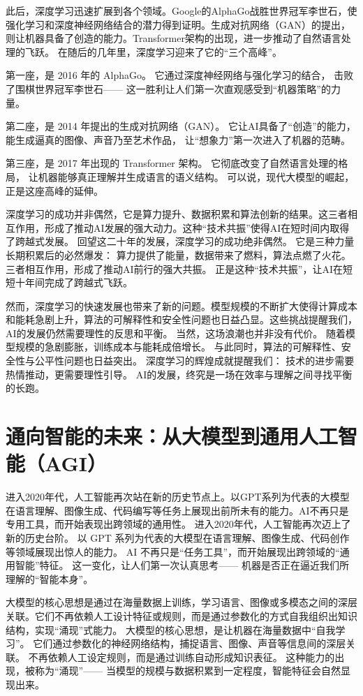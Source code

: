 此后，深度学习迅速扩展到各个领域。Google的AlphaGo战胜世界冠军李世石，使强化学习和深度神经网络结合的潜力得到证明。生成对抗网络（GAN）的提出，则让机器具备了创造的能力。Transformer架构的出现，进一步推动了自然语言处理的飞跃。
在随后的几年里，深度学习迎来了它的“三个高峰”。  

第一座，是 2016 年的 AlphaGo。  
它通过深度神经网络与强化学习的结合，  
击败了围棋世界冠军李世石——  
这一胜利让人们第一次直观感受到“机器策略”的力量。  

第二座，是 2014 年提出的生成对抗网络（GAN）。  
它让AI具备了“创造”的能力，  
能生成逼真的图像、声音乃至艺术作品，  
让“想象力”第一次进入了机器的范畴。  

第三座，是 2017 年出现的 Transformer 架构。  
它彻底改变了自然语言处理的格局，  
让机器能够真正理解并生成语言的语义结构。  
可以说，现代大模型的崛起，正是这座高峰的延伸。  

深度学习的成功并非偶然，它是算力提升、数据积累和算法创新的结果。这三者相互作用，形成了推动AI发展的强大动力。这种“技术共振”使得AI在短时间内取得了跨越式发展。
回望这二十年的发展，深度学习的成功绝非偶然。  
它是三种力量长期积累后的必然爆发：  
算力提供了能量，数据带来了燃料，算法点燃了火花。  
三者相互作用，形成了推动AI前行的强大共振。  
正是这种“技术共振”，让AI在短短十年间完成了跨越式飞跃。  

然而，深度学习的快速发展也带来了新的问题。模型规模的不断扩大使得计算成本和能耗急剧上升，算法的可解释性和安全性问题也日益凸显。这些挑战提醒我们，AI的发展仍然需要理性的反思和平衡。
当然，这场浪潮也并非没有代价。  
随着模型规模的急剧膨胀，训练成本与能耗成倍增长。  
与此同时，算法的可解释性、安全性与公平性问题也日益突出。  
深度学习的辉煌成就提醒我们：  
技术的进步需要热情推动，更需要理性引导。  
AI的发展，终究是一场在效率与理解之间寻找平衡的长跑。  

\section{通向智能的未来：从大模型到通用人工智能（AGI）}

进入2020年代，人工智能再次站在新的历史节点上。以GPT系列为代表的大模型在语言理解、图像生成、代码编写等任务上展现出前所未有的能力。AI不再只是专用工具，而开始表现出跨领域的通用性。
进入2020年代，人工智能再次迈上了新的历史台阶。  
以 GPT 系列为代表的大模型在语言理解、图像生成、代码创作等领域展现出惊人的能力。  
AI 不再只是“任务工具”，而开始展现出跨领域的“通用智能”特征。  
这一变化，让人们第一次认真思考——  
机器是否正在逼近我们所理解的“智能本身”。  

大模型的核心思想是通过在海量数据上训练，学习语言、图像或多模态之间的深层关联。它们不再依赖人工设计特征或规则，而是通过参数化的方式自我组织出知识结构，实现“涌现”式能力。
大模型的核心思想，是让机器在海量数据中“自我学习”。  
它们通过参数化的神经网络结构，捕捉语言、图像、声音等信息间的深层关联。  
不再依赖人工设定规则，而是通过训练自动形成知识表征。  
这种能力的出现，被称为“涌现”——  
当模型的规模与数据积累到一定程度，智能特征会自然显现出来。  


